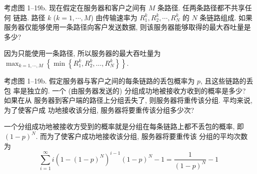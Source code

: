 \documentclass[boxes]{homework}
\begin{document}
\begin{problem}
考虑图 1--19b. 现在假定在服务器和客户之间有 $M$ 条路径. 任两条路径都不共享任何
链路. 路径 $k$ ($k = 1, \cdots, M$) 由传输速率为 $R^k_{1}, R^k_{2}, \cdots,
    R^k_{N}$ 的 $N$ 条链路组成. 如果服务器仅能够使用一条路径向客户发送数据,
则该服务器能够取得的最大吞吐量是多少?
\end{problem}
\begin{solution}
    因为只能使用一条路径, 所以服务器的最大吞吐量为
    $\max_{k = 1, \cdots, M} \left\{ \min
        \left\{ R^{k}_{1}, R^{k}_{2}, \ldots, R^{k}_{N} \right\}\right\}$.
\end{solution}

\begin{problem}
考虑图 1--19b. 假定服务器与客户之间的每条链路的丢包概率为 $p$, 且这些链路的丢包
率是独立的. 一个 (由服务器发送的) 分组成功地被接收方收到的概率是多少? 如果在从
服务器到客户端的路径上分组丢失了, 则服务器将重传该分组. 平均来说, 为了使客户成
功地接收该分组, 服务器将要重传该分组多少次?
\end{problem}
\begin{solution}
    一个分组成功地被接收方受到的概率就是分组在每条链路上都不丢包的概率, 即
    ${\left( 1 - p\right)}^{N}$. 而为了使客户成功地接收该分组, 服务器将要重传该
    分组的平均次数为
    \begin{equation}
        \sum_{i = 1}^{\infty} i \left(1 - \left( 1 - p\right)^{N}\right)^{i - 1}
        \left( 1 - p\right)^{N} - 1 =
        \frac{ 1 }{ {\left( 1 - p\right)}^{N} } - 1
    \end{equation}
\end{solution}
\end{document}
